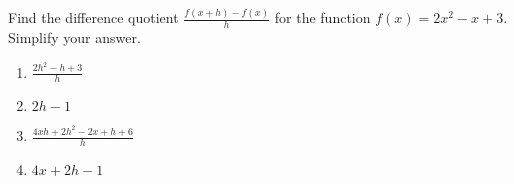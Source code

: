 \bigskip

\item Find the difference quotient $\frac{f(x+h)-f(x)}{h}$ for the function $f(x)=2x^2-x+3$.  Simplify your answer.

\begin{enumerate}
\item $\frac{2h^2-h+3}{h}$
\item $2h-1$
\item $\frac{4xh+2h^2-2x+h+6}{h}$
\item $4x+2h-1$
\end{enumerate}

